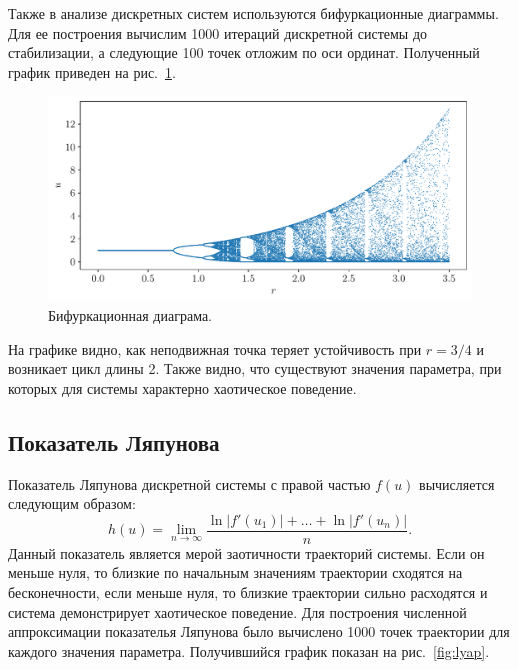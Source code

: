 \documentclass[12pt, a4paper]{article} %
\begin{document}
Также в анализе дискретных систем используются бифуркационные диаграммы.
Для ее построения вычислим 1000 итераций дискретной системы до стабилизации, а следующие 100 точек отложим по оси ординат.
Полученный график приведен на рис.~\ref{fig:bifurc1}.

\begin{figure}[ht]
    \centering
    \includegraphics[width=\textwidth]{figures/bifurc1.pdf}
    \caption{Бифуркационная диаграма.}
    \label{fig:bifurc1}
\end{figure}

На графике видно, как неподвижная точка теряет устойчивость при $r=3\!/4$ и возникает цикл длины 2. 
Также видно, что существуют значения параметра, при которых для системы характерно хаотическое поведение.

\subsection{Показатель Ляпунова}

Показатель Ляпунова дискретной системы с правой частью $f(u)$ вычисляется следующим образом:
 \begin{equation}\label{eq:lyap}
     h(u) = \lim\limits_{n \rightarrow \infty}
     \frac{\ln \lvert f'(u_1) \rvert +\ldots + \ln \lvert f'(u_n) \rvert }{n}
.\end{equation} 
Данный показатель является мерой заотичности траекторий системы.
Если он меньше нуля, то близкие по начальным значениям траектории сходятся на бесконечности,
если меньше нуля, то близкие траектории сильно расходятся и система демонстрирует хаотическое поведение.
Для построения численной аппроксимации показателья Ляпунова было вычислено 1000 точек траектории для каждого значения параметра.
Получившийся график показан на рис.~\ref{fig:lyap}.
\end{document}
